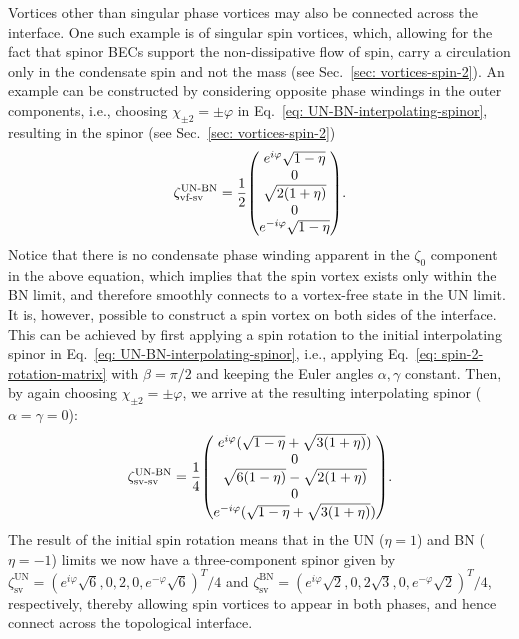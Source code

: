 Vortices other than singular phase vortices may also be connected across the
interface.
One such example is of singular spin vortices, which, allowing for the fact that
spinor BECs support the non-dissipative flow of spin, carry a circulation only
in the condensate spin and not the mass (see Sec.~\ref{sec: vortices-spin-2}).
An example can be constructed by considering opposite phase windings in the
outer components, i.e., choosing \(\chi_{\pm 2} = \pm \varphi \) in
Eq.~\eqref{eq: UN-BN-interpolating-spinor}, resulting in the spinor
(see Sec.~\ref{sec: vortices-spin-2})
\begin{align}\label{eq: UN-BN-vf-sv}
    \zeta_\text{vf-sv}^\text{UN-BN} = \frac{1}{2}\mqty(
        e^{i\varphi}\sqrt{1 - \eta} \\
        0 \\
        \sqrt{2(1+\eta)} \\
        0 \\
        e^{-i\varphi}\sqrt{1 - \eta}
    ).
\end{align}
Notice that there is no condensate phase winding apparent in the \(\zeta_0\)
component in the above equation, which implies that the spin vortex exists only
within the BN limit, and therefore smoothly connects to a vortex-free state in
the UN limit.
It is, however, possible to construct a spin vortex on both sides of the
interface.
This can be achieved by first applying a spin rotation to the initial
interpolating spinor in Eq.~\eqref{eq: UN-BN-interpolating-spinor}, i.e.,
applying Eq.~\eqref{eq: spin-2-rotation-matrix} with \(\beta = \pi/2\) and
keeping the Euler angles \(\alpha, \gamma \) constant.
Then, by again choosing \(\chi_{\pm 2} = \pm \varphi \), we arrive at the
resulting interpolating spinor (\(\alpha = \gamma = 0\)):
\begin{align}\label{eq: UN-BN-sv-sv}
    \zeta_\text{sv-sv}^\text{UN-BN} = \frac{1}{4}\mqty(
        e^{i\varphi}(\sqrt{1 - \eta} + \sqrt{3(1+\eta)}) \\
        0 \\
        \sqrt{6(1-\eta)} - \sqrt{2(1+\eta)} \\
        0 \\
        e^{-i\varphi}(\sqrt{1 - \eta} + \sqrt{3(1+\eta)})
    ).
\end{align}
The result of the initial spin rotation means that in the UN (\(\eta = 1\)) and
BN (\(\eta = -1\)) limits we now have a three-component spinor given by
\(\zeta^\text{UN}_\text{sv} = {(e^{i\varphi}\sqrt{6}, 0, 2, 0,
e^{-\varphi}\sqrt{6})}^T/4\) and
\(\zeta^\text{BN}_\text{sv} = {(e^{i\varphi}\sqrt{2}, 0, 2\sqrt{3}, 0,
e^{-\varphi}\sqrt{2})}^T/4\), respectively, thereby allowing spin vortices to
appear in both phases, and hence connect across the topological interface.

